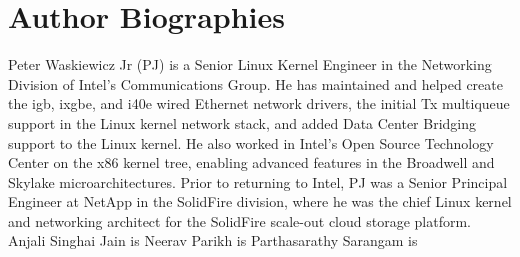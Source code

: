 \documentclass[letterpaper]{article}
\begin{document}
\section{Author Biographies}
Peter Waskiewicz Jr (PJ) is a Senior Linux Kernel Engineer in the Networking Division of Intel's Communications Group. He has maintained and helped create the igb, ixgbe, and i40e wired Ethernet network drivers, the initial Tx multiqueue support in the Linux kernel network stack, and added Data Center Bridging support to the Linux kernel. He also worked in Intel's Open Source Technology Center on the x86 kernel tree, enabling advanced features in the Broadwell and Skylake microarchitectures. Prior to returning to Intel, PJ was a Senior Principal Engineer at NetApp in the SolidFire division, where he was the chief Linux kernel and networking architect for the SolidFire scale-out cloud storage platform.
\newline
\newline
Anjali Singhai Jain is 
\newline
\newline
Neerav Parikh is
\newline
\newline
Parthasarathy Sarangam is
\end{document}
